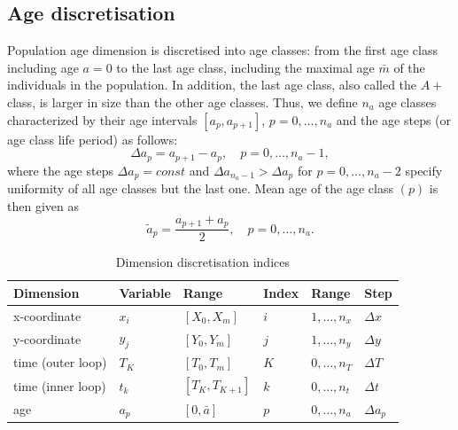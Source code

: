 \subsection{Age discretisation}
\label{sec:d-age}

Population age dimension is discretised into age classes: from the first age class including age $a=0$ to the last age class, including the maximal age $\bar{m}$ of the individuals in the population. In addition, the last age class, also called the $A+$ class, is larger in size than the other age classes. Thus, we define $n_a$ age classes characterized by their age intervals  $[a_p, a_{p+1}]$, $p=0,\dots, n_a$ and the age steps (or age class life period) as follows:
\begin{equation}
  \label{eq:Delta-a}
  \Delta a_p  =a_{p+1} - a_p,\quad p=0,\dots, n_a-1,
\end{equation}
\noindent where the age steps $\Delta a_p = const$ and  $\Delta a_{n_a-1}>\Delta a_p$ for $p=0,\dots, n_a-2$ specify uniformity of all age classes but the last one. Mean age of the age class ${(p)}$ is then given as 
\begin{equation}
  \label{eq:cohort-mean-age}
  \widetilde{a}_{p} = \dfrac{a_{p+1}+a_{p}}{2},\quad p=0,\dots, n_a.
\end{equation}


\begin{table}[!htb]
  \centering
  \begin{tabular}{l|l|l|l|l|l}
    \textbf{Dimension} & \textbf{Variable} & \textbf{Range} & \textbf{Index} & \textbf{Range}  & \textbf{Step}\\
    \hline   \hline                                                                    
    x-coordinate      & $x_i$ & $[X_0,X_m]$      & $i$   & $1,\dots,n_x$ & $\Delta x$ \\\hline
    y-coordinate      & $y_j$ & $[Y_0, Y_m]$     & $j$   & $1,\dots,n_y$ & $\Delta y$ \\\hline
    time (outer loop) & $T_K$ & $[T_0,T_m]$      & $K$   & $0,\dots,n_T$ & $\Delta T$ \\\hline
    time (inner loop) & $t_k$ & $[T_K,T_{K+1}]$  & $k$   & $0,\dots,n_t$ & $\Delta t$ \\\hline
    age               & $a_p$ & $[0,\bar{a}]$    & $p$   & $0,\dots,n_a$ & $\Delta a_p$ \\\hline
    \hline
  \end{tabular}
  \caption{\label{tab:indices}Dimension discretisation indices}
\end{table}

